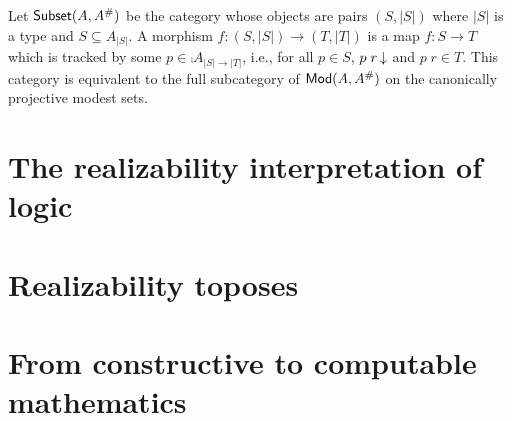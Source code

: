 Let $\mathsf{Subset}(A, A^{\#})$ be the category whose objects are pairs
$(S, |S|)$ where $|S|$ is a type and $S \subseteq A_{|S|}$. A morphism
$f : (S, |S|) \to (T, |T|)$ is a map $f : S \to T$ which is tracked by
some $p \in \comp{A}_{|S| \to |T|}$, i.e., for all $p \in S$,
$p\;r\,{\downarrow}$ and $p\;r \in T$. This category is equivalent to the
full subcategory of $\mathsf{Mod}(A, A^{\#})$ on the canonically projective
modest sets.


\section{The realizability interpretation of logic}
\label{sec:realizability-interpretation}

\section{Realizability toposes}
\label{sec:realizability-toposes}

\section{From constructive to computable mathematics}
\label{sec:constructive-math}



